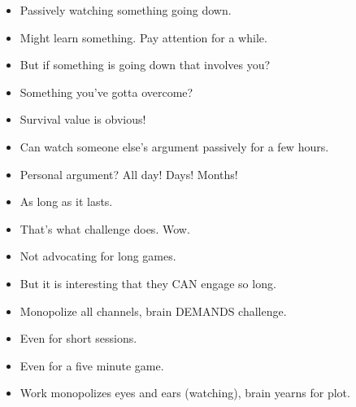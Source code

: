 \documentclass[12pt]{article}
\begin{document}
{
\begin{itemize}

\item Passively watching something going down.

\item Might learn something.  Pay attention for a while.

\item But if something is going down that involves you?

\item Something you've gotta overcome?

\item Survival value is obvious!
\end{itemize}

\begin{itemize}

\item Can watch someone else's argument passively for a few hours.

\item Personal argument?  All day!  Days!  Months!

\item As long as it lasts.

\item That's what challenge does.  Wow.

\item Not advocating for long games.

\item But it is interesting that they CAN engage so long.

\item Monopolize all channels, brain DEMANDS challenge.
\end{itemize}

\begin{itemize}

\item Even for short sessions.

\item Even for a five minute game.
\end{itemize}


\begin{itemize}

\item Work monopolizes eyes and ears (watching), brain yearns for plot.


\end{itemize}}
\end{document}
